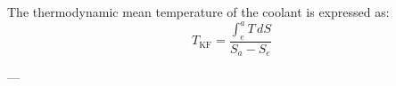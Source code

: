 The thermodynamic mean temperature of the coolant is expressed as:  
\[
T_{\text{KF}} = \frac{\int_{e}^{a} T \, dS}{S_a - S_e}
\]

---